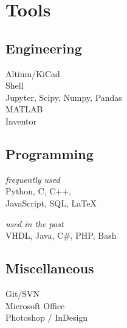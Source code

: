 \documentclass[]{resume}
\begin{document}
\section{Tools}
\subsection{Engineering}
Altium/KiCad\\
Shell\\
Jupyter, Scipy, Numpy, Pandas\\
MATLAB\\
Inventor
\sectionsep

\subsection{Programming}
\textit{frequently used}\\
Python, C, C++,\\
JavaScript, SQL, LaTeX
\sectionsep

\textit{used in the past}\\
VHDL, Java, C\#, PHP, Bash
\sectionsep

\subsection{Miscellaneous}
Git/SVN\\
Microsoft Office\\
Photoshop / InDesign
\sectionsep

%
%
\end{document}

